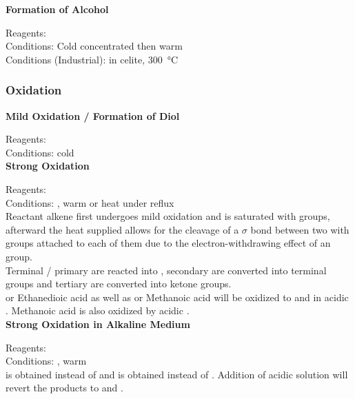 \documentclass[../main]{subfiles}
\begin{document}
	\noindent \textbf{Formation of Alcohol}

	Reagents:  \\
	Conditions: Cold concentrated  then warm  \\
	Conditions (Industrial):  in celite, \SI{300}{\celsius} \\

	\subsubsection{Oxidation}

	\noindent \textbf{Mild Oxidation / Formation of Diol}

	Reagents: \\
	Conditions:  cold \\

	\noindent \textbf{Strong Oxidation}

	Reagents: \\
	Conditions: , warm or heat under reflux \\

	Reactant alkene first undergoes mild oxidation and is saturated with  groups, afterward the heat supplied allows for the cleavage of a \(\sigma\) bond between two  with  groups attached to each of them due to the electron-withdrawing effect of an  group. \\

	Terminal / primary  are reacted into , secondary  are converted into terminal  groups and tertiary  are converted into ketone groups. \\

	 or Ethanedioic acid as well as  or Methanoic acid will be oxidized to  and  in acidic . Methanoic acid is also oxidized by acidic . \\

	\noindent \textbf{Strong Oxidation in Alkaline Medium}

	Reagents:  \\
	Conditions: , warm \\

	 is obtained instead of  and  is obtained instead of . Addition of acidic solution will revert the products to  and . \\
\end{document}
